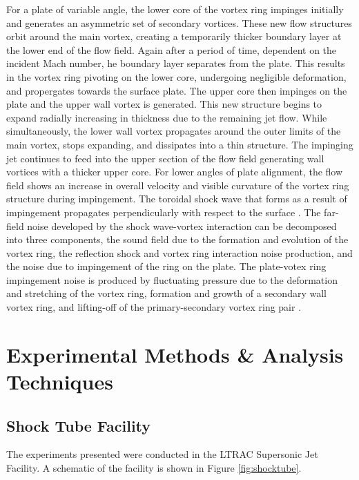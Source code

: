 For a plate of variable angle, the lower core of the vortex ring impinges initially and generates an asymmetric set of secondary vortices. These new flow structures orbit around the main vortex, creating a temporarily thicker boundary layer at the lower end of the flow field. Again after a period of time, dependent on the incident Mach number, he boundary layer separates from the plate. This results in the vortex ring pivoting on the lower core, undergoing negligible deformation, and propergates towards the surface plate. The upper core then impinges on the plate and the upper wall vortex is generated. This new structure begins to expand radially increasing in thickness due to the remaining jet flow. While simultaneously, the lower wall vortex propagates around the outer limits of the main vortex, stops expanding, and dissipates into a thin structure. The impinging jet continues to feed into the upper section of the flow field generating wall vortices with a thicker upper core. For lower angles of plate alignment, the flow field shows an increase in overall velocity and visible curvature of the vortex ring structure during impingement. The toroidal shock wave that forms as a result of impingement propagates perpendicularly with respect to the surface \cite{mariani2013head}.  
%
The far-field noise developed by the shock wave-vortex interaction can be decomposed into three components, the sound field due to the formation and evolution of the vortex ring, the reflection shock and vortex ring interaction noise production, and the noise due to impingement of the ring on the plate. The plate-votex ring impingement noise is produced by fluctuating pressure due to the deformation and stretching of the vortex ring, formation and growth of a secondary wall vortex ring, and lifting-off of the primary-secondary vortex ring pair \cite{murugan2010characteristics}.


\newpage
\section{Experimental Methods \& Analysis Techniques}
\subsection{Shock Tube Facility}
The experiments presented were conducted in the LTRAC Supersonic Jet Facility. A schematic of the facility is shown in Figure \ref{fig:shocktube}. 

